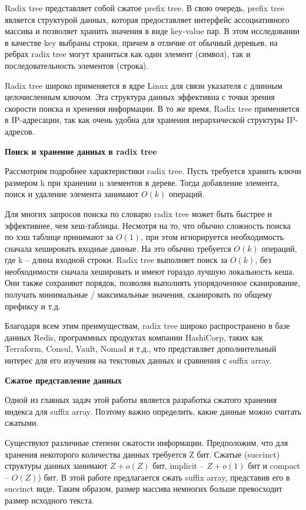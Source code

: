 Radix tree представляет собой сжатое prefix tree. В свою очередь, prefix tree является
структурой данных, которая предоставляет интерфейс ассоциативного массива и позволяет
хранить значения в виде key-value пар.
В этом исследовании в качестве key выбраны строки, причем в отличие от обычный деревьев,
на ребрах radix tree могут храниться как один элемент (символ),
так и последовательность элементов (строка).

Radix tree широко применяется в ядре Linux для связи указателя с длинным целочисленным ключом.
Эта структура данных эффективна с точки зрения скорости поиска и хренения информации.
В то же время, Radix tree применяется в IP-адресации, так как очень удобна для хранения
иерархической структуры IP-адресов.

\textbf{Поиск и хранение данных в radix tree}

Рассмотрим подробнее характеристики radix tree. Пусть требуется хранить ключи размером k
при хранении n элементов в дереве. Тогда добавление элемента, поиск и удаление элемента
занимают $O(k)$ операций.

Для многих запросов поиска по словарю radix tree может быть быстрее и эффективнее, чем хеш-таблицы.
Несмотря на то, что обычно сложность поиска по хэш таблице принимают за $O(1)$,
при этом игнорируется необходимость сначала хешировать входные данные.
На это обычно требуется $O(k)$ операций, где k -- длина входной строки.
Radix tree выполняет поиск за $O(k)$, без необходимости сначала хешировать и имеют гораздо лучшую локальность кеша.
Они также сохраняют порядок, позволяя выполнять упорядоченное сканирование,
получать минимальные / максимальные значения, сканировать по общему префиксу и т.д.

Благодаря всем этим преимуществам, radix tree широко распространено в базе данных Redis, программных продуктах
компании HashiCorp, таких как Terraform, Consul, Vault, Nomad и т.д.,
что представляет дополнительный интерес для его изучения на текстовых данных и сравнения с suffix array.

\textbf{Сжатое представление данных}

Одной из главных задач этой работы является разработка сжатого хранения индекса для suffix array.
Поэтому важно определить, какие данные можно считать сжатыми.

Существуют различные степени сжатости информации.
Предположим, что для хранения некоторого количества данных требуется Z бит.
Сжатые (succinct) структуры данных занимают \(Z + o(Z)\) бит, implicit -- \(Z + o(1)\) бит и
compact -- \(O(Z)\)) бит. В этой работе предлагается сжать suffix array, представив его в succinct виде.
Таким образом, размер массива немногих больше превосходит размер исходного текста.

